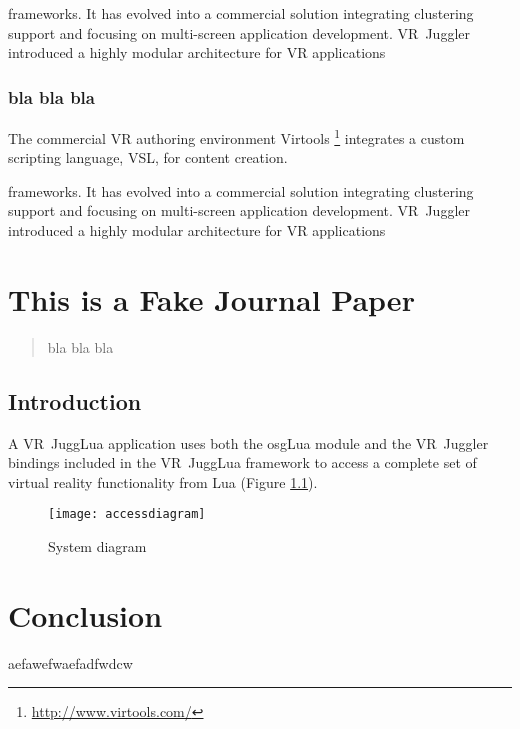 \documentclass[capstoc,capschap,draftcls]{rpisudiss}
\begin{document}
frameworks. It has evolved into a commercial solution integrating
clustering support and focusing on multi-screen application development.
VR~Juggler introduced a highly modular architecture for VR applications

\subsection{bla bla bla}
The commercial
VR authoring environment Virtools%
\footnote{\url{http://www.virtools.com/}%
} integrates a custom scripting language, VSL, for content creation.

frameworks. It has evolved into a commercial solution integrating
clustering support and focusing on multi-screen application development.
VR~Juggler introduced a highly modular architecture for VR applications
\chapter{This is a Fake Journal Paper}









\begin{abstract}
 bla bla bla
\end{abstract}
\section{Introduction}
A VR~JuggLua application uses both the osgLua module
and the VR~Juggler bindings included in the VR~JuggLua framework
to access a complete set of virtual reality functionality from Lua
(Figure \ref{fig:System-diagram}).
\begin{figure}
    \centering
    \texttt{[image: accessdiagram]}
    \caption{\label{fig:System-diagram}System diagram}
\end{figure}


\chapter{Conclusion}

aefawefwaefadfwdcw




\end{document}
